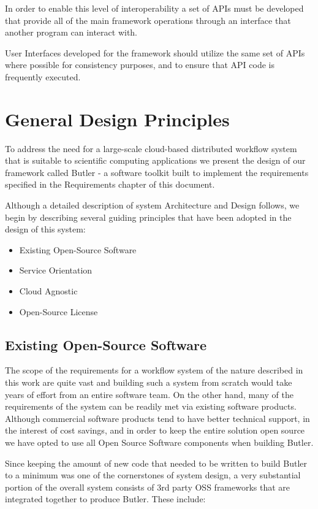 In order to enable this level of interoperability a set of APIs must be developed that provide all of the main framework operations through an interface that another program can interact with.

User Interfaces developed for the framework should utilize the same set of APIs where possible for consistency purposes, and to ensure that API code is frequently executed.

\section{General Design Principles}
To address the need for a large-scale cloud-based distributed workflow system that is suitable to scientific computing applications we present the design of our framework called Butler - a software toolkit built to implement the requirements specified in the Requirements chapter of this document.

Although a detailed description of system Architecture and Design follows, we begin by describing several guiding principles that have been adopted in the design of this system:

\begin{itemize}
\item Existing Open-Source Software
\item Service Orientation
\item Cloud Agnostic
\item Open-Source License
\end{itemize}

\subsection {Existing Open-Source Software}

The scope of the requirements for a workflow system of the nature described in this work are quite vast and building such a system from scratch would take years of effort from an entire software team. On the other hand, many of the requirements of the system can be readily met via existing software products. Although commercial software products tend to have better technical support, in the interest of cost savings, and in order to keep the entire solution open source we have opted to use all Open Source Software components when building Butler.

Since keeping the amount of new code that needed to be written to build Butler to a minimum was one of the cornerstones of system design, a very substantial portion of the overall system consists of 3rd party OSS frameworks that are integrated together to produce Butler. These include:

